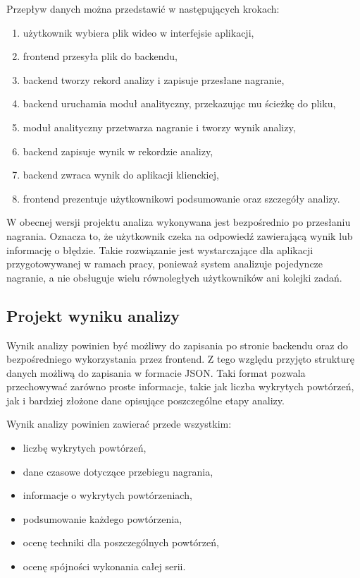 Przepływ danych można przedstawić w następujących krokach:

\begin{enumerate}
\item użytkownik wybiera plik wideo w interfejsie aplikacji,
\item frontend przesyła plik do backendu,
\item backend tworzy rekord analizy i zapisuje przesłane nagranie,
\item backend uruchamia moduł analityczny, przekazując mu ścieżkę do pliku,
\item moduł analityczny przetwarza nagranie i tworzy wynik analizy,
\item backend zapisuje wynik w rekordzie analizy,
\item backend zwraca wynik do aplikacji klienckiej,
\item frontend prezentuje użytkownikowi podsumowanie oraz szczegóły analizy.
\end{enumerate}

W obecnej wersji projektu analiza wykonywana jest bezpośrednio po przesłaniu nagrania. Oznacza to, że użytkownik czeka na odpowiedź zawierającą wynik lub informację o błędzie. Takie rozwiązanie jest wystarczające dla aplikacji przygotowywanej w ramach pracy, ponieważ system analizuje pojedyncze nagranie, a nie obsługuje wielu równoległych użytkowników ani kolejki zadań.

\subsection{Projekt wyniku analizy}

Wynik analizy powinien być możliwy do zapisania po stronie backendu oraz do bezpośredniego wykorzystania przez frontend. Z tego względu przyjęto strukturę danych możliwą do zapisania w formacie JSON. Taki format pozwala przechowywać zarówno proste informacje, takie jak liczba wykrytych powtórzeń, jak i bardziej złożone dane opisujące poszczególne etapy analizy.

Wynik analizy powinien zawierać przede wszystkim:

\begin{itemize}
\item liczbę wykrytych powtórzeń,
\item dane czasowe dotyczące przebiegu nagrania,
\item informacje o wykrytych powtórzeniach,
\item podsumowanie każdego powtórzenia,
\item ocenę techniki dla poszczególnych powtórzeń,
\item ocenę spójności wykonania całej serii.
\end{itemize}

